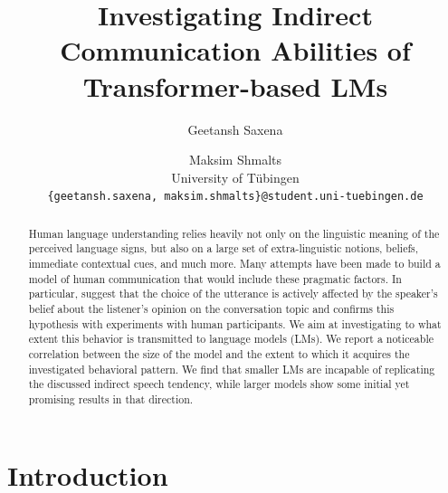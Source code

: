 \documentclass[11pt]{article}
\title{Investigating Indirect Communication Abilities of Transformer-based LMs}
\author{Geetansh Saxena \and Maksim Shmalts \\
        University of Tübingen \\
        \texttt{\{geetansh.saxena, maksim.shmalts\}@student.uni-tuebingen.de}}
\begin{document}
\maketitle


\begin{abstract}
Human language understanding relies heavily not only on the linguistic meaning of the perceived language signs, but also on a large set of extra-linguistic notions, beliefs, immediate contextual cues, and much more. Many attempts have been made to build a model of human communication that would include these pragmatic factors. In particular, \citet{achimova-2025} suggest that the choice of the utterance is actively affected by the speaker’s belief about the listener’s opinion on the conversation topic and confirms this hypothesis with experiments with human participants. We aim at investigating to what extent this behavior is transmitted to language models (LMs). We report a noticeable correlation between the size of the model and the extent to which it acquires the investigated behavioral pattern. We find that smaller LMs are incapable of replicating the discussed indirect speech tendency, while larger models show some initial yet promising results in that direction.
\end{abstract}


\section{Introduction}
\label{sec:intro}
\end{document}

